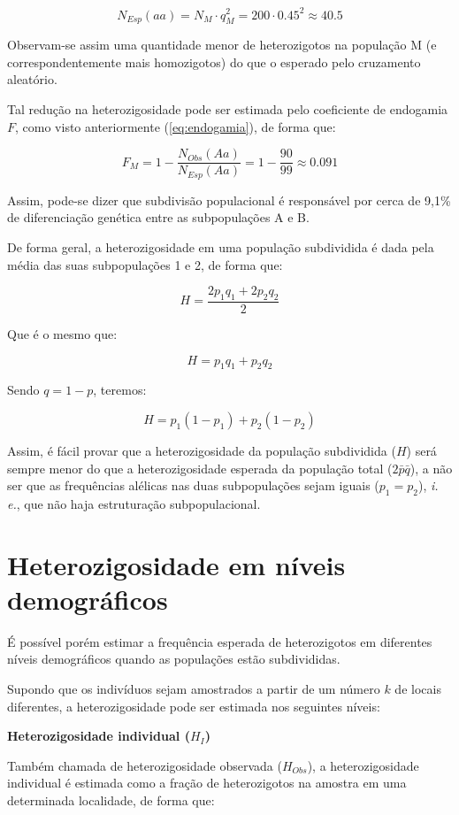 \documentclass[
]{book}
\begin{document}
\[N_{Esp}(aa) = N_M\cdot q_M^2 = 200 \cdot 0.45^2 \approx 40.5\]

Observam-se assim uma quantidade menor de heterozigotos na população M (e correspondentemente mais homozigotos) do que o esperado pelo cruzamento aleatório.

Tal redução na heterozigosidade pode ser estimada pelo coeficiente de endogamia \(F\), como visto anteriormente (\eqref{eq:endogamia}), de forma que:

\[F_M = 1 - \frac{N_{Obs}(Aa)}{N_{Esp}(Aa)} = 1 - \frac{90}{99} \approx 0.091\]

Assim, pode-se dizer que subdivisão populacional é responsável por cerca de 9,1\% de diferenciação genética entre as subpopulações A e B.

De forma geral, a heterozigosidade em uma população subdividida é dada pela média das suas subpopulações 1 e 2, de forma que:

\[H = \frac{2p_1q_1 + 2p_2q_2}{2}\]

Que é o mesmo que:

\[H = p_1q_1 + p_2q_2\]

Sendo \(q = 1-p\), teremos:

\[H = p_1(1-p_1) + p_2(1-p_2)\]

Assim, é fácil provar que a heterozigosidade da população subdividida (\(H\)) será sempre menor do que a heterozigosidade esperada da população total (\(2\bar{p}\bar{q}\)), a não ser que as frequências alélicas nas duas subpopulações sejam iguais (\(p_1 = p_2\)), \emph{i. e.}, que não haja estruturação subpopulacional.

\hypertarget{heterozigosidade-em-nuxedveis-demogruxe1ficos}{%
\section{Heterozigosidade em níveis demográficos}\label{heterozigosidade-em-nuxedveis-demogruxe1ficos}}

É possível porém estimar a frequência esperada de heterozigotos em diferentes níveis demográficos quando as populações estão subdivididas.

Supondo que os indivíduos sejam amostrados a partir de um número \(k\) de locais diferentes, a heterozigosidade pode ser estimada nos seguintes níveis:

\textbf{Heterozigosidade individual (\(H_I\))}

Também chamada de heterozigosidade observada (\(H_{Obs}\)), a heterozigosidade individual é estimada como a fração de heterozigotos na amostra em uma determinada localidade, de forma que:
\end{document}
